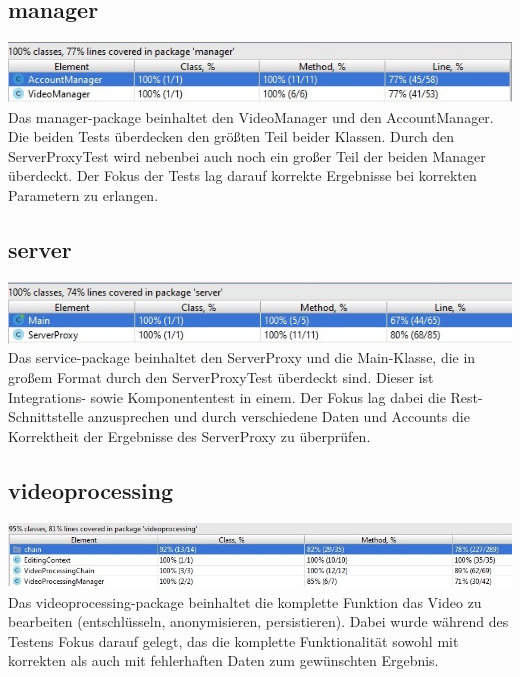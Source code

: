\subsection{manager}
\includegraphics[scale=0.8]{resources/manager.jpg}
Das manager-package beinhaltet den VideoManager und den AccountManager. Die beiden Tests überdecken den größten Teil beider Klassen. Durch den ServerProxyTest wird nebenbei auch noch ein großer Teil der beiden Manager überdeckt. Der Fokus der Tests lag darauf korrekte Ergebnisse bei korrekten Parametern zu erlangen.
\subsection{server}
\includegraphics[scale=0.81]{resources/server.jpg}
Das service-package beinhaltet den ServerProxy und die Main-Klasse, die in großem Format durch den ServerProxyTest überdeckt sind. Dieser ist Integrations- sowie Komponententest in einem. Der Fokus lag dabei die Rest-Schnittstelle anzusprechen und durch verschiedene Daten und Accounts die Korrektheit der Ergebnisse des ServerProxy zu überprüfen. 
\subsection{videoprocessing}
\includegraphics[scale=0.6]{resources/videoprocessing.jpg}
Das videoprocessing-package beinhaltet die komplette Funktion das Video zu bearbeiten (entschlüsseln, anonymisieren, persistieren). Dabei wurde während des Testens Fokus darauf gelegt, das die komplette Funktionalität sowohl mit korrekten als auch mit fehlerhaften Daten zum gewünschten Ergebnis. 
